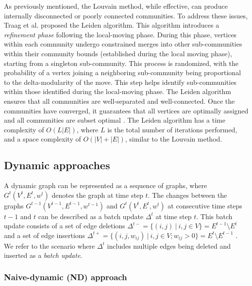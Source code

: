 As previously mentioned, the Louvain method, while effective, can produce internally disconnected or poorly connected communities. To address these issues, Traag et al. \cite{com-traag19} proposed the Leiden algorithm. This algorithm introduces a \textit{refinement phase} following the local-moving phase. During this phase, vertices within each community undergo constrained merges into other sub-communities within their community bounds (established during the local moving phase), starting from a singleton sub-community. This process is randomized, with the probability of a vertex joining a neighboring sub-community being proportional to the delta-modularity of the move. This step helps identify sub-communities within those identified during the local-moving phase. The Leiden algorithm ensures that all communities are well-separated and well-connected. Once the communities have converged, it guarantees that all vertices are optimally assigned and all communities are subset optimal \cite{com-traag19}. The Leiden algorithm has a time complexity of $O(L|E|)$, where $L$ is the total number of iterations performed, and a space complexity of $O(|V| + |E|)$, similar to the Louvain method.




\subsection{Dynamic approaches}
\label{sec:dynamic-graphs}

A dynamic graph can be represented as a sequence of graphs, where $G^t(V^t, E^t, w^t)$ denotes the graph at time step $t$. The changes between the graphs $G^{t-1}(V^{t-1}, E^{t-1}, w^{t-1})$ and $G^t(V^t, E^t, w^t)$ at consecutive time steps $t-1$ and $t$ can be described as a batch update $\Delta^t$ at time step $t$. This batch update consists of a set of edge deletions $\Delta^{t-} = \{(i, j)\ |\ i, j \in V\} = E^{t-1} \setminus E^t$ and a set of edge insertions $\Delta^{t+} = \{(i, j, w_{ij})\ |\ i, j \in V; w_{ij} > 0\} = E^t \setminus E^{t-1}$ \cite{com-zarayeneh21}. We refer to the scenario where $\Delta^t$ includes multiple edges being deleted and inserted as a \textit{batch update}.




\subsubsection{Naive-dynamic (ND) approach}
\label{sec:naive-dynamic}

